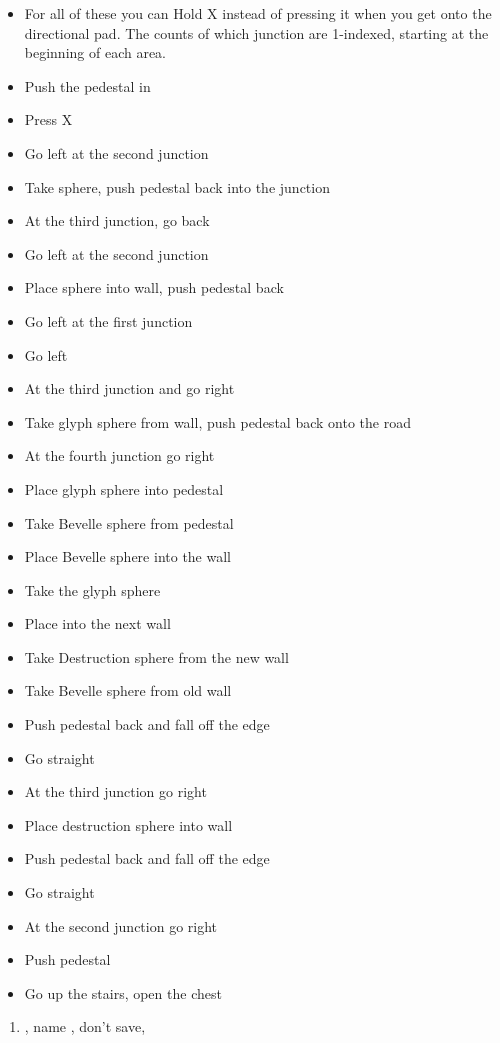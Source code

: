 \begin{trial}
	\begin{itemize}
		\item For all of these you can Hold X instead of pressing it when you get onto the directional pad. The counts of which junction are 1-indexed, starting at the beginning of each area.
		\item Push the pedestal in
		\item Press X
		\item Go left at the second junction
		\item Take sphere, push pedestal back into the junction
		\item At the third junction, go back
		\item Go left at the second junction
		\item Place sphere into wall, push pedestal back
		\item Go left at the first junction
		\item Go left
		\item At the third junction and go right
		\item Take glyph sphere from wall, push pedestal back onto the road
		\item At the fourth junction go right
		\item Place glyph sphere into pedestal
		\item Take Bevelle sphere from pedestal
		\item Place Bevelle sphere into the wall
		\item Take the glyph sphere
		\item Place into the next wall
		\item Take Destruction sphere from the new wall %
		\item Take Bevelle sphere from old wall
		\item Push pedestal back and fall off the edge
		\item Go straight
		\item At the third junction go right
		\item Place destruction sphere into wall
		\item Push pedestal back and fall off the edge
		\item Go straight
		\item At the second junction go right
		\item Push pedestal
		\item Go up the stairs, open the chest
	\end{itemize}
\end{trial}
\begin{enumerate}[resume]
	\item \sd, name \bahamut, don't save, \sd
\end{enumerate}
\lossvfill
\ 
\losscb
\ \lossnewline \ 